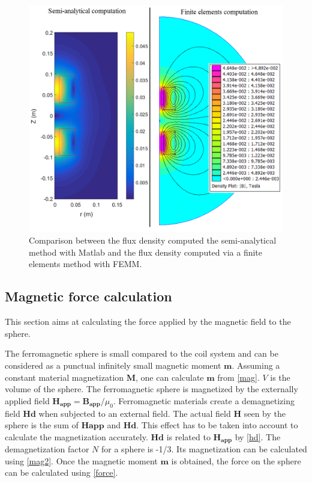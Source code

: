 \documentclass[letterpaper, 10 pt, conference]{ieeeconf}  %
\begin{document}
\begin{figure}
  \includegraphics[width=\linewidth]{Femm_matlab_comparison.png}
  \caption{Comparison between the flux density computed the semi-analytical method with Matlab and the flux density computed via a finite elements method with FEMM.}
  \label{Femm_matlab_comparison}
\end{figure}

\subsection{Magnetic force calculation}
\label{magforce}

This section aims at calculating the force applied by the magnetic field to the sphere.\par
The ferromagnetic sphere is small compared to the coil system and can be considered as a punctual infinitely small magnetic moment $\mathbf{m}$. Assuming a constant material magnetization $\mathbf{M}$, one can calculate $\mathbf{m}$ from \cref{mag}. $V$ is the volume of the sphere.
The ferromagnetic sphere is magnetized by the externally applied field $\mathbf{H_{app}}=\mathbf{B_{app}}/\mu_0$. Ferromagnetic materials create a demagnetizing field $\mathbf{Hd}$ when subjected to an external field. The actual field $\mathbf{H}$ seen by the sphere is the sum of $\mathbf{Happ}$ and $\mathbf{Hd}$. This effect has to be taken into account to calculate the magnetization accurately. $\mathbf{Hd}$ is related to $\mathbf{H_{app}}$ by \cref{hd}. The demagnetization factor $N$ for a sphere is -1/3. Its magnetization can be calculated using \cref{mag2}.
Once the magnetic moment $\mathbf{m}$ is obtained, the force on the sphere can be calculated using \cref{force}.
\end{document}
